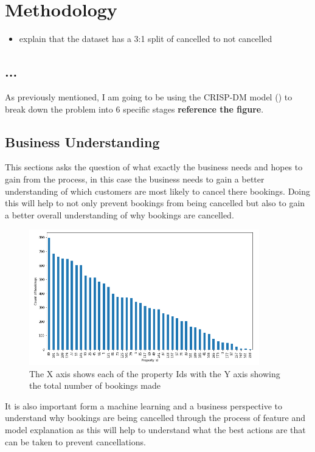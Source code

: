 \chapter{Methodology}
\label{ch:method}

\begin{itemize}
\item explain that the dataset has a 3:1 split of cancelled to not cancelled
\end{itemize}

\section{...}
As previously mentioned, I am going to be using the CRISP-DM model (\cite{WirthCRISP-DM:Mining}) to break down the problem into 6 specific stages \textbf{reference the figure}.


\section{Business Understanding}

This sections asks the question of what exactly the business needs and hopes to gain from the process, in this case the business needs to gain a better understanding of which customers are most likely to cancel there bookings. Doing this will help to not only prevent bookings from being cancelled but also to gain a better overall understanding of why bookings are cancelled. 

\begin{figure}[hbt!]
 \includegraphics[width=10cm]{figures/bookings_by_property.png}
 \caption{The X axis shows each of the property Ids with the Y axis showing the total number of bookings made}
\end{figure}

It is also important form a machine learning and a business perspective to understand why bookings are being cancelled through the process of feature and model explanation as this will help to understand what the best actions are that can be taken to prevent cancellations.

